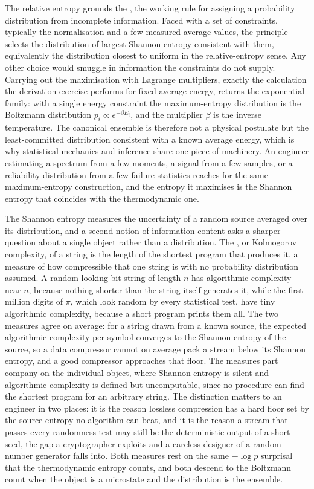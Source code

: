 The relative entropy grounds the , the working
rule for assigning a probability distribution from incomplete information. Faced
with a set of constraints, typically the normalisation and a few measured average
values, the principle selects the distribution of largest Shannon entropy
consistent with them, equivalently the distribution closest to uniform in the
relative-entropy sense. Any other choice would smuggle in information the
constraints do not supply. Carrying out the maximisation with Lagrange multipliers,
exactly the calculation the derivation exercise performs for fixed average energy,
returns the exponential family: with a single energy constraint the maximum-entropy
distribution is the Boltzmann distribution $p_i \propto e^{-\beta E_i}$, and the
multiplier $\beta$ is the inverse temperature. The canonical ensemble is therefore
not a physical postulate but the least-committed distribution consistent with a
known average energy, which is why statistical mechanics and inference share one
piece of machinery. An engineer estimating a spectrum from a few moments, a
signal from a few samples, or a reliability distribution from a few failure
statistics reaches for the same maximum-entropy construction, and the entropy it
maximises is the Shannon entropy that coincides with the thermodynamic one.

The Shannon entropy measures the uncertainty of a random source averaged over its
distribution, and a second notion of information content asks a sharper question
about a single object rather than a distribution. The , or Kolmogorov complexity, of a string is the length of the shortest
program that produces it, a measure of how compressible that one string is with no
probability distribution assumed. A random-looking bit string of length $n$ has
algorithmic complexity near $n$, because nothing shorter than the string itself
generates it, while the first million digits of $\pi$, which look random by every
statistical test, have tiny algorithmic complexity, because a short program prints
them all. The two measures agree on average: for a string drawn from a known
source, the expected algorithmic complexity per symbol converges to the Shannon
entropy of the source, so a data compressor cannot on average pack a stream below
its Shannon entropy, and a good compressor approaches that floor. The measures
part company on the individual object, where Shannon entropy is silent and
algorithmic complexity is defined but uncomputable, since no procedure can find the
shortest program for an arbitrary string. The distinction matters to an engineer
in two places: it is the reason lossless compression has a hard floor set by the
source entropy no algorithm can beat, and it is the reason a stream that passes
every randomness test may still be the deterministic output of a short seed, the
gap a cryptographer exploits and a careless designer of a random-number generator
falls into. Both measures rest on the same $-\log p$ surprisal that the
thermodynamic entropy counts, and both descend to the Boltzmann count when the
object is a microstate and the distribution is the ensemble.

